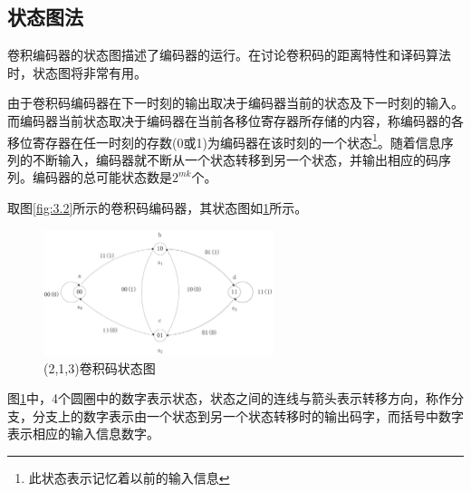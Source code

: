 \subsection{状态图法}
卷积编码器的状态图描述了编码器的运行。在讨论卷积码的距离特性和译码算法时，状态图将非常有用。

由于卷积码编码器在下一时刻的输出取决于编码器当前的状态及下一时刻的输入。而编码器当前状态取决于编码器在当前各移位寄存器所存储的内容，称编码器的各移位寄存器在任一时刻的存数(0或1)为编码器在该时刻的一个状态\footnote{此状态表示记忆着以前的输入信息}。随着信息序列的不断输入，编码器就不断从一个状态转移到另一个状态，并输出相应的码序列。编码器的总可能状态数是$2^{mk}$个。

取图\ref{fig:3.2}所示的卷积码编码器，其状态图如\ref{fig:3.3}所示。
\begin{figure}[htb]
  \begin{center}
    \includegraphics[width=0.6\textwidth]{images/conv3.pdf}
  \end{center}
  \caption{(2,1,3)卷积码状态图}
  \label{fig:3.3}
\end{figure}
图\ref{fig:3.3}中，4个圆圈中的数字表示状态，状态之间的连线与箭头表示转移方向，称作分支，分支上的数字表示由一个状态到另一个状态转移时的输出码字，而括号中数字表示相应的输入信息数字。
